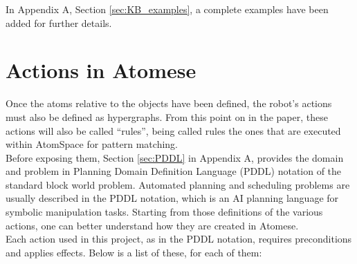 In Appendix A, Section \ref{sec:KB_examples}, a complete examples have been added for further details.

\section{Actions in Atomese}\label{sec:domain_atomese}
Once the atoms relative to the objects have been defined, the robot's actions must also be defined as hypergraphs. 
From this point on in the paper, these actions will also be called \enquote{rules}, being called rules the ones that are executed within AtomSpace for pattern matching. \\
Before exposing them, Section \ref{sec:PDDL} in Appendix A, provides the domain and problem in Planning Domain Definition Language (PDDL) notation of the standard block world problem.
Automated planning and scheduling problems are usually described in the PDDL notation, which is an AI planning language for symbolic manipulation tasks.
Starting from those definitions of the various actions, one can better understand how they are created in Atomese. \\

Each action used in this project, as in the PDDL notation, requires preconditions and applies effects. Below is a list of these, for each of them:

